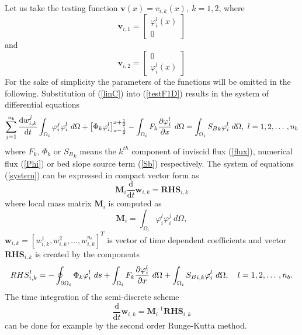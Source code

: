  Let us take the testing function $\mathbf{v}(x)=v_{i,k}(x), \ k=1,2$, where
 \begin{equation}
  \mathbf{v}_{i,1}=\begin{bmatrix}
  \varphi_i^l(x)\\
  0
  \end{bmatrix}
  \end{equation}
  and
 \begin{equation}
  \mathbf{v}_{i,2}=\begin{bmatrix}
0\\
  \varphi_i^l(x)
  \end{bmatrix}
  \end{equation}
For the sake of simplicity the parameters of the functions will be omitted in the following. Substitution of (\ref{linC}) into (\ref{testF1D}) results in the system of differential equations\small
\begin{equation}\label{system}
\sum_{j=1}^{n_b} \frac{\text{d}w_{i,k}^j}{\text{d}t}   \int_{\Omega_i}\varphi^j_i \varphi^l_i  \ d\Omega +\left[ \Phi_k \varphi_i^l\right]_{x-\frac12}^{x+\frac12} -\int_{\Omega_i} F_k \parc{\varphi_i^l}{x} \ d\Omega=\int_{\Omega_i} {S_B}_k \varphi_i^l \ d\Omega,  \  l=1,2,\dotso, n_b
\end{equation}\normalsize
where $F_k$, $\Phi_k$ or ${S_B}_k$ means the $k^{th}$ component of inviscid flux (\ref{flux}), numerical flux (\ref{Phi}) or bed slope source term (\ref{Sb}) respectively. The system of equations (\ref{system}) can be expressed in compact vector form as
\begin{equation}\label{semi}
\mathbf{M}_i\frac{\text{d}}{\text{d}t}\mathbf{w}_{i,k}= \mathbf{RHS}_{i,k}
\end{equation}
where local mass matrix $\mathbf{M}_i$ is computed as
\begin{equation}
\mathbf{M}_i=\int_{\Omega_i} \varphi^l_i \varphi^j_i  \ d\Omega,
\end{equation}
 $\mathbf{w}_{i,k}=[w_{i,k}^1,w_{i,k}^2, \dotso, w_{i,k}^{n_b}]^T$ is vector of time dependent coefficients and   vector $\mathbf{RHS}_{i,k}$ is created by the components
\begin{equation}
RHS^l_{i,k}=-\oint_{\partial \Omega_i} \Phi_k \varphi_i^l \
ds+\int_{\Omega_i} F_k \parc{\varphi_i^l}{x} \ d\Omega+\int_{\Omega_i}{S_B}_{i,k} \varphi_i^l \ d\Omega, \quad l=1,2,\dotso, n_b.
\end{equation}
The time integration of the semi-discrete scheme
\begin{equation}\label{semiB}
\frac{\text{d}}{\text{d}t}\mathbf{w}_{i,k}= \mathbf{M}_i^{-1}\mathbf{RHS}_{i,k}
\end{equation}
can be done for example by the second order Runge-Kutta method.

